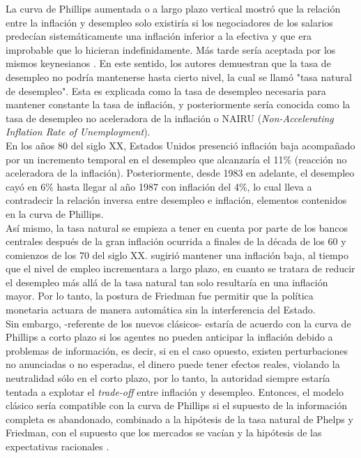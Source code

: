 La curva de Phillips aumentada o a largo plazo vertical mostró que la relación entre la inflación y desempleo solo existiría si los negociadores de los salarios predecían sistemáticamente una inflación inferior a la efectiva y que era improbable que lo hicieran indefinidamente. Más tarde sería aceptada por los mismos keynesianos \citep{blinder1997there,mankiw1991reincarnation}. En este sentido, los autores demuestran que la tasa de desempleo no podría mantenerse hasta cierto nivel, la cual se llamó "tasa natural de desempleo". Esta es explicada como la tasa de desempleo necesaria para mantener constante la tasa de inflación, y posteriormente sería conocida como la tasa de desempleo no aceleradora de la inflación o NAIRU (\textit{Non-Accelerating Inflation Rate of Unemployment}).\\

En los años 80 del siglo XX, Estados Unidos presenció inflación baja acompañado por un incremento temporal en el desempleo que alcanzaría el 11\% (reacción no aceleradora de la inflación). Posteriormente, desde 1983 en adelante, el desempleo cayó en 6\% hasta llegar al año 1987 con inflación del 4\%, lo cual lleva a contradecir la relación inversa entre desempleo e inflación, elementos contenidos en la curva de Phillips. \\

Así mismo, la tasa natural se empieza a tener en cuenta por parte de los bancos centrales después de la gran inflación ocurrida a finales de la década de los 60 y comienzos de los 70 del siglo XX. \cite{friedman1968role}   sugirió mantener una inflación baja, al tiempo que el nivel de empleo incrementara a largo plazo, en cuanto se tratara de reducir el desempleo más allá de la tasa natural tan solo resultaría en una inflación mayor. Por lo tanto, la postura de Friedman fue permitir que la política monetaria actuara de manera automática sin la interferencia del Estado.\\

Sin embargo, \cite{lucas1973some} -referente de los nuevos clásicos- estaría de acuerdo con la curva de Phillips a corto plazo si los agentes no pueden anticipar la inflación  debido a problemas de información, es decir, si en el caso opuesto, existen perturbaciones no anunciadas o no esperadas, el dinero puede tener efectos reales, violando la neutralidad sólo en el corto plazo, por lo tanto, la autoridad siempre estaría tentada a explotar el \textit{trade-off} entre inflación y desempleo. Entonces, el modelo clásico sería compatible con la curva de Phillips si el supuesto de la información completa es abandonado, combinado a la hipótesis de la tasa natural de Phelps y Friedman, con el supuesto que los mercados se vacían y la hipótesis de las expectativas racionales \citep{snowdon1994modern}. \\

